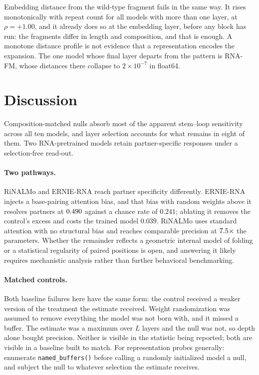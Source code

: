 \documentclass{article}
\begin{document}
Embedding distance from the wild-type fragment fails in the same way. It rises
monotonically with repeat count for all \httMonotone{} models with more than one
layer, at $\rho = +1.00$, and it already does so at the embedding layer, before
any block has run: the fragments differ in length and composition, and that is
enough. A monotone distance profile is not evidence that a representation
encodes the expansion. The one model whose final layer departs from the pattern
is RNA-FM, whose distances there collapse to $2 \times 10^{-7}$ in float64.

\section{Discussion}
\label{sec:discussion}

Composition-matched nulls absorb most of the apparent stem--loop sensitivity
across all ten models, and layer selection accounts for what remains in eight of
them. Two RNA-pretrained models retain partner-specific responses under a
selection-free read-out.

\paragraph{Two pathways.} RiNALMo and ERNIE-RNA reach partner specificity
differently. ERNIE-RNA injects a base-pairing attention bias, and that bias with
random weights above it resolves partners at
$0.490{}$ against a chance rate of
$0.241$; ablating it removes the control's excess and costs the trained model
$0.039$. RiNALMo uses standard attention with no structural bias and reaches
comparable precision at $7.5{}\times$ the parameters. Whether the remainder
reflects a geometric internal model of folding or a statistical regularity of
paired positions is open, and answering it likely requires mechanistic analysis
rather than further behavioral benchmarking.

\paragraph{Matched controls.} Both baseline failures here have the same
form: the control received a weaker version of the treatment the estimate
received. Weight randomization was assumed to remove everything the model was not
born with, and it missed a buffer. The estimate was a maximum over $L$ layers
and the null was not, so depth alone bought precision. Neither is visible in the
statistic being reported; both are visible in a baseline built to match. For
representation probes generally: enumerate \texttt{named\_buffers()} before
calling a randomly initialized model a null, and subject the null to whatever
selection the estimate receives.
\end{document}
